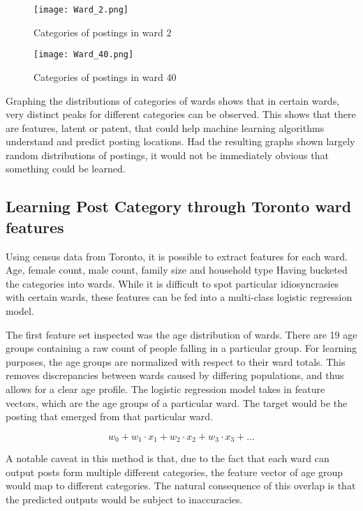 \documentclass[12pt]{article}
\begin{document}
   \begin{figure}[h]
   \centering
   \texttt{[image: Ward\_2.png]}
   \caption{Categories of postings in ward 2}
   \end{figure}

   \begin{figure}[h]
   \centering
   \texttt{[image: Ward\_40.png]}
   \caption{Categories of postings in ward 40}
   \end{figure}

   Graphing the distributions of categories of wards shows that in certain wards, very distinct peaks for different categories can be observed. This shows that there are features, latent or patent, that could help machine learning algorithms understand and predict posting locations. Had the resulting graphs shown largely random distributions of postings, it would not be immediately obvious that something could be learned. 

   \subsection{Learning Post Category through Toronto ward features}
   Using census data from Toronto, it is possible to extract features for each ward. Age, female count, male count, family size and household type 
   Having bucketed the categories into wards. While it is difficult to spot particular idiosyncrasies with certain wards, these features can be fed into a multi-class logistic regression model. 

   The first feature set inspected was the age distribution of wards. There are 19 age groups containing a raw count of people falling in a particular group. For learning purposes, the age groups are normalized with respect to their ward totals. This removes discrepancies between wards caused by differing populations, and thus allows for a clear age profile. The logistic regression model takes in feature vectors, which are the age groups of a particular ward. The target would be the posting that emerged from that particular ward.

   \[w_0 + w_1 \cdot x_1 + w_2 \cdot x_2 + w_3 \cdot x_3 + ...\]

   A notable caveat in this method is that, due to the fact that each ward can output posts form multiple different categories, the feature vector of age group would map to different categories. The natural consequence of this overlap is that the predicted outputs would be subject to inaccuracies. 
\end{document}
